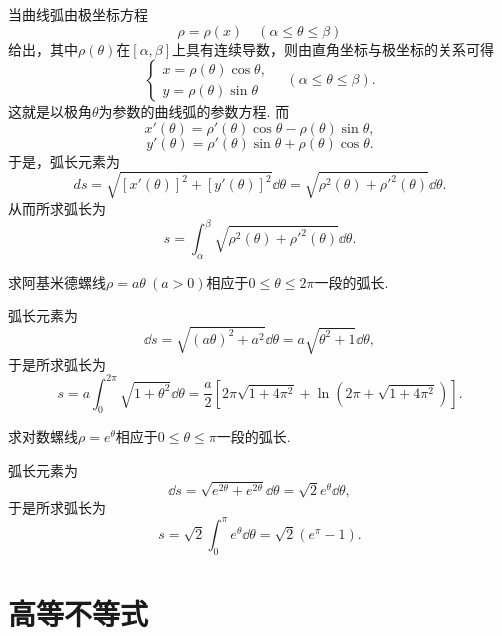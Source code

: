 当曲线弧由极坐标方程\[
\rho=\rho(x)
\quad(\alpha \leq \theta \leq \beta)
\]给出，其中\(\rho(\theta)\)在\([\alpha,\beta]\)上具有连续导数，则由直角坐标与极坐标的关系可得\[
\left\{ \begin{array}{c}
x = \rho(\theta) \cos\theta, \\
y = \rho(\theta) \sin\theta
\end{array} \right.
\quad(\alpha \leq \theta \leq \beta).
\]
这就是以极角\(\theta\)为参数的曲线弧的参数方程.
而\[
x'(\theta) = \rho'(\theta) \cos\theta - \rho(\theta) \sin\theta,
\]\[
y'(\theta) = \rho'(\theta) \sin\theta + \rho(\theta) \cos\theta.
\]
于是，弧长元素为\[
ds = \sqrt{[x'(\theta)]^2 + [y'(\theta)]^2} \dd{\theta}
= \sqrt{\rho^2(\theta) + \rho'^2(\theta)} \dd{\theta}.
\]从而所求弧长为\begin{equation}
s = \int_{\alpha}^{\beta} \sqrt{\rho^2(\theta) + \rho'^2(\theta)} \dd{\theta}.
\end{equation}

\begin{example}
求阿基米德螺线\(\rho=a\theta\ (a>0)\)相应于\(0\leq\theta\leq2\pi\)一段的弧长.
\begin{solution}
弧长元素为\[
\dd{s} = \sqrt{(a\theta)^2 + a^2} \dd{\theta}
= a\sqrt{\theta^2+1} \dd{\theta},
\]于是所求弧长为\[
s = a \int_0^{2\pi} \sqrt{1+\theta^2} \dd{\theta}
= \frac{a}{2} \left[
2\pi\sqrt{1+4\pi^2} + \ln(2\pi+\sqrt{1+4\pi^2})
\right].
\]
\end{solution}
\end{example}

\begin{example}
求对数螺线\(\rho=e^{\theta}\)相应于\(0\leq\theta\leq\pi\)一段的弧长.
\begin{solution}
弧长元素为\[
\dd{s} = \sqrt{e^{2\theta}+e^{2\theta}} \dd{\theta}
= \sqrt{2}e^{\theta} \dd{\theta},
\]于是所求弧长为\[
s = \sqrt{2} \int_0^{\pi} e^{\theta} \dd{\theta}
= \sqrt{2} (e^{\pi}-1).
\]
\end{solution}
\end{example}

\section{高等不等式}
